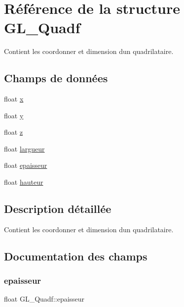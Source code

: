 \hypertarget{struct_g_l___quadf}{}\section{Référence de la structure G\+L\+\_\+\+Quadf}
\label{struct_g_l___quadf}


Contient les coordonner et dimension d\textquotesingle{}un quadrilataire.  


\subsection*{Champs de données}
\begin{DoxyCompactItemize}
\item 
float \hyperlink{struct_g_l___quadf_aec36eeea9c60ec7ad4a9f5a8cc8224af}{x}
\item 
float \hyperlink{struct_g_l___quadf_a7f8b67ef0f48272d9b4b354f92e36c07}{y}
\item 
float \hyperlink{struct_g_l___quadf_ac22f8d2876a5b047db37b09dd02edc89}{z}
\item 
float \hyperlink{struct_g_l___quadf_ada25d106338ba16ff6e8b7fdead87264}{largueur}
\item 
float \hyperlink{struct_g_l___quadf_ac98c09a27ab17b932e540e3d31f882f6}{epaisseur}
\item 
float \hyperlink{struct_g_l___quadf_a78bc225ce25f93b9de79ef1ca707a50e}{hauteur}
\end{DoxyCompactItemize}


\subsection{Description détaillée}
Contient les coordonner et dimension d\textquotesingle{}un quadrilataire. 

\subsection{Documentation des champs}
\mbox{\label{struct_g_l___quadf_ac98c09a27ab17b932e540e3d31f882f6}} 
\subsubsection{\texorpdfstring{epaisseur}{epaisseur}}
{\footnotesize\ttfamily float G\+L\+\_\+\+Quadf\+::epaisseur}

